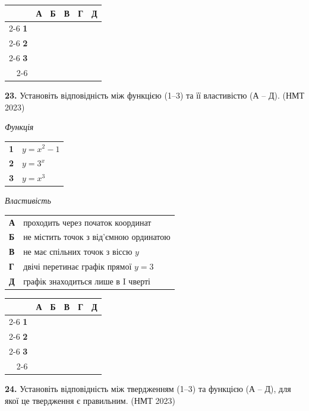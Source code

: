 \documentclass[14pt]{extarticle}
\newcommand{\answerGrid}{
    \begingroup
    \renewcommand{\arraystretch}{1.3} 
    \setlength{\tabcolsep}{7pt} 
    \begin{tabular}{r|c|c|c|c|c|}
         \multicolumn{1}{c}{} & \multicolumn{1}{c}{\textbf{А}} & \multicolumn{1}{c}{\textbf{Б}} & \multicolumn{1}{c}{\textbf{В}} & \multicolumn{1}{c}{\textbf{Г}} & \multicolumn{1}{c}{\textbf{Д}} \\ \cline{2-6}
         \textbf{1} & & & & & \\ \cline{2-6}
         \textbf{2} & & & & & \\ \cline{2-6}
         \textbf{3} & & & & & \\ \cline{2-6}
    \end{tabular}
    \endgroup
}
\newcommand{\nmtyear}[1]{\hfill{\small\color{yearcolor}(НМТ #1)}}
\begin{document}
\vspace{0.3cm}
\answerGrid

\vspace{0.7cm}

\noindent\textbf{23.} Установіть відповідність між функцією (1–3) та її властивістю (А – Д). \nmtyear{2023}

\vspace{0.3cm}

\noindent
\begin{minipage}[t]{0.45\textwidth}
    \textit{Функція} \par \vspace{0.2cm}
    \begin{tabular}{@{}p{0.5cm} l@{}}
    \textbf{1} & $y=x^2-1$ \\[0.4cm]
    \textbf{2} & $y=3^x$ \\[0.4cm]
    \textbf{3} & $y=x^3$ \\
    \end{tabular}
\end{minipage}%
\hfill
\begin{minipage}[t]{0.50\textwidth}
    \textit{Властивість} \par \vspace{0.2cm}
    \begin{tabular}{@{}p{0.5cm} p{7cm}@{}}
    \textbf{А} & проходить через початок координат \\[0.2cm]
    \textbf{Б} & не містить точок з від'ємною ординатою \\[0.2cm]
    \textbf{В} & не має спільних точок з віссю $y$ \\[0.2cm]
    \textbf{Г} & двічі перетинає графік прямої $y=3$ \\[0.2cm]
    \textbf{Д} & графік знаходиться лише в I чверті \\
    \end{tabular}
\end{minipage}

\vspace{0.3cm}
\answerGrid

\vspace{0.7cm}
\noindent\textbf{24.} Установіть відповідність між твердженням (1–3) та функцією (А – Д), для якої це твердження є правильним. \nmtyear{2023}

\vspace{0.3cm}
\end{document}
